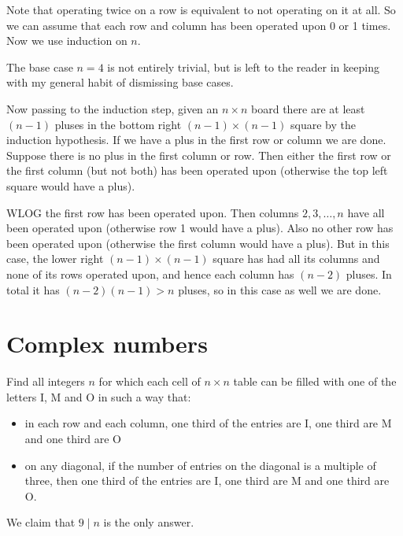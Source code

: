 Note that operating twice on a row is equivalent to not operating on it at all. So we can assume that each row and column has been operated upon 0 or 1 times. Now we use induction on $n$.

The base case $n=4$ is not entirely trivial, but is left to the reader in keeping with my general habit of dismissing base cases.

Now passing to the induction step, given an $n\times n$ board there are at least $(n-1)$ pluses in the bottom right $(n-1)\times (n-1)$ square by the induction hypothesis. If we have a plus in the first row or column we are done. Suppose there is no plus in the first column or row. Then either the first row or the first column (but not both) has been operated upon (otherwise the top left square would have a plus).

WLOG the first row has been operated upon. Then columns $2, 3, \dots, n$ have all been operated upon (otherwise row 1 would have a plus). Also no other row has been operated upon (otherwise the first column would have a plus). But in this case, the lower right $(n-1)\times (n-1)$ square has had all its columns and none of its rows operated upon, and hence each column has $(n-2)$ pluses. In total it has $(n-2)(n-1) > n$ pluses, so in this case as well we are done.

\newpage

\section{Complex numbers}

\begin{example} [IMO 2016]
    Find all integers $n$ for which each cell of $n\times n$ table can be filled with one of the letters I, M and O in such a way that:
    \begin{itemize}
        \item in each row and each column, one third of the entries are I, one third are M and one third are O
        \item on any diagonal, if the number of entries on the diagonal is a multiple of three, then one third of the entries are I, one third are M and one third are O.
    \end{itemize}
\end{example}

We claim that $9\mid n$ is the only answer.

